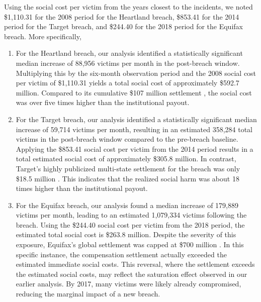 Using the social cost per victim from the years closest to the incidents, we noted \$1,110.31 for the 2008 period for the Heartland breach, \$853.41 for the 2014 period for the Target breach, and \$244.40 for the 2018 period for the Equifax breach. 
More specifically, 
\begin{enumerate}
\item For the Heartland breach, our analysis identified a statistically significant median increase of 88,956 victims per month in the post-breach window. Multiplying this by the six-month observation period and the 2008 social cost per victim of \$1,110.31 yields a total social cost of approximately \$592.7 million. Compared to its cumulative \$107 million settlement \cite{heartland_amex_2009, heartland_mastercard_2010, heartland_visa_2010, heartland_consumer_2012}, the social cost was over five times higher than the institutional payout.

\item For the Target breach, our analysis identified a statistically significant median increase of 59,714 victims per month, resulting in an estimated 358,284 total victims in the post-breach window compared to the pre-breach baseline. Applying the \$853.41 social cost per victim from the 2014 period results in a total estimated social cost of approximately \$305.8 million.  In contrast, Target's highly publicized multi-state settlement for the breach was only \$18.5 million \cite{TexasAG_TargetSettlement}. This indicates that the realized social harm was about 18 times higher than the institutional payout. 


\item For the Equifax breach, our analysis found a median increase of 179,889 victims per month, leading to an estimated 1,079,334 victims following the breach. Using the \$244.40 social cost per victim from the 2018 period, the estimated total social cost is \$263.8 million. Despite the severity of this exposure, Equifax's global settlement was capped at \$700 million \cite{FTC_EquifaxSettlement}. In this specific instance, the compensation settlement actually exceeded the estimated immediate social costs. This reversal, where the settlement exceeds the estimated social costs, may reflect the saturation effect observed in our earlier analysis. By 2017, many victims were likely already compromised, reducing the marginal impact of a new breach. 
\end{enumerate}

